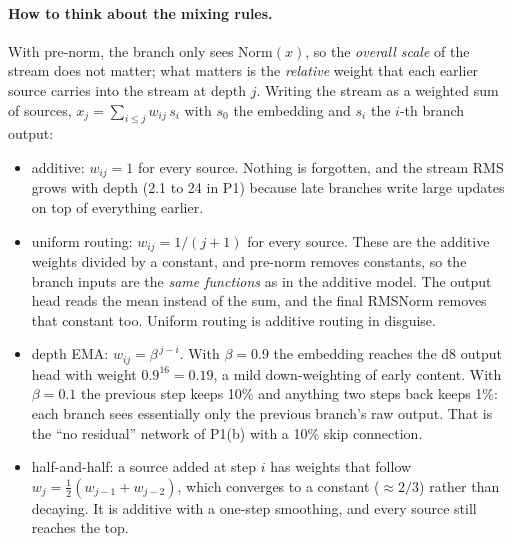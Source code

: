 \paragraph{How to think about the mixing rules.} With pre-norm, the branch only sees $\mathrm{Norm}(x)$, so the \emph{overall scale} of the stream does not matter; what matters is the \emph{relative} weight that each earlier source carries into the stream at depth $j$. Writing the stream as a weighted sum of sources, $x_j = \sum_{i \le j} w_{ij}\, s_i$ with $s_0$ the embedding and $s_i$ the $i$-th branch output:
\begin{itemize}
\item additive: $w_{ij} = 1$ for every source. Nothing is forgotten, and the stream RMS grows with depth (2.1 to 24 in P1) because late branches write large updates on top of everything earlier.
\item uniform routing: $w_{ij} = 1/(j+1)$ for every source. These are the additive weights divided by a constant, and pre-norm removes constants, so the branch inputs are the \emph{same functions} as in the additive model. The output head reads the mean instead of the sum, and the final RMSNorm removes that constant too. Uniform routing is additive routing in disguise.
\item depth EMA: $w_{ij} = \beta^{\,j-i}$. With $\beta=0.9$ the embedding reaches the d8 output head with weight $0.9^{16} = 0.19$, a mild down-weighting of early content. With $\beta=0.1$ the previous step keeps 10\% and anything two steps back keeps 1\%: each branch sees essentially only the previous branch's raw output. That is the ``no residual'' network of P1(b) with a 10\% skip connection.
\item half-and-half: a source added at step $i$ has weights that follow $w_{j} = \tfrac12(w_{j-1}+w_{j-2})$, which converges to a constant ($\approx 2/3$) rather than decaying. It is additive with a one-step smoothing, and every source still reaches the top.
\end{itemize}

